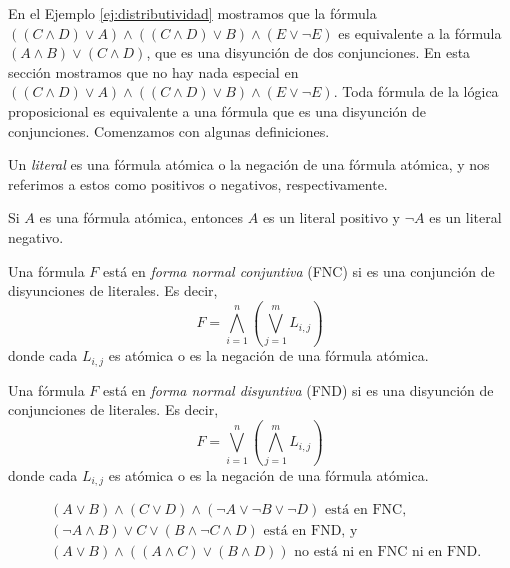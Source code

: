 \documentclass[12pt,a4paper]{book}
\begin{document}
    En el Ejemplo \ref{ej:distributividad} mostramos que la fórmula $((C\wedge D)\vee A)\wedge((C\wedge D)\vee B)\wedge(E\vee\neg E)$
    es equivalente a la fórmula $(A\wedge B)\vee(C\wedge D)$, que es una disyunción de dos conjunciones. En esta sección
    mostramos que no hay nada especial en $((C\wedge D)\vee A)\wedge((C\wedge D)\vee B)\wedge(E\vee\neg E)$. Toda fórmula de la
    lógica proposicional es equivalente a una fórmula que es una disyunción de conjunciones. Comenzamos con algunas
    definiciones.

    \begin{definicion}[Literal]\label{def:literal}
        Un \textit{literal} es una fórmula atómica o la negación de una fórmula atómica, y nos referimos a estos como
        positivos o negativos, respectivamente.
    \end{definicion}

    \begin{ejemplo}
        Si $A$ es una fórmula atómica, entonces $A$ es un literal positivo y $\neg A$ es un literal negativo.
    \end{ejemplo}

    \begin{definicion}\label{def:fnc}
        Una fórmula $F$ está en \textit{forma normal conjuntiva} (FNC) si es una conjunción de disyunciones de literales. Es
        decir,
        \begin{equation*}
            F=\bigwedge_{i=1}^{n}\left(\bigvee_{j=1}^{m}L_{i,j}\right)
        \end{equation*}
        donde cada $L_{i,j}$ es atómica o es la negación de una fórmula atómica.
    \end{definicion}

    \begin{definicion}\label{def:fnd}
        Una fórmula $F$ está en \textit{forma normal disyuntiva} (FND) si es una disyunción de conjunciones de literales. Es
        decir,
        \begin{equation*}
            F=\bigvee_{i=1}^{n}\left(\bigwedge_{j=1}^{m}L_{i,j}\right)
        \end{equation*}
        donde cada $L_{i,j}$ es atómica o es la negación de una fórmula atómica.
    \end{definicion}

    \begin{ejemplo}\label{ej:fnc-fnd-ejemplos}
        \begin{align*}
            &(A\vee B)\wedge(C\vee D)\wedge(\neg A\vee\neg B\vee\neg D)\text{ está en FNC,}\\
            &(\neg A\wedge B)\vee C\vee(B\wedge\neg C\wedge D)\text{ está en FND, y}\\
            &(A\vee B)\wedge((A\wedge C)\vee(B\wedge D))\text{ no está ni en FNC ni en FND.}
        \end{align*}
    \end{ejemplo}
\end{document}
